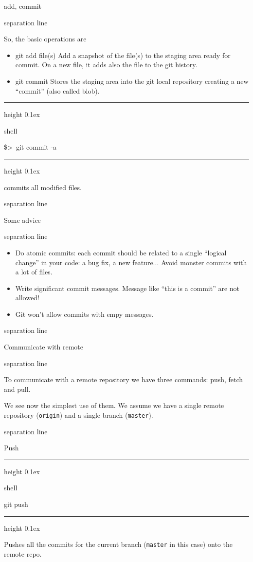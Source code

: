 \documentclass{beamer}
\newenvironment{shell}{%
\footnotesize\flushleft\hrule height 0.1ex
\tt\begin{beamercolorbox}[sep=1ex,left]{shell}%
}{%
\end{beamercolorbox}
\hrule height 0.1ex
\endflushleft\par
}
\newcommand*{\psone}[1][ant]{\$>~}
\newcommand{\titleline}[1][0.025cm]{%
\begin{beamercolorbox}[wd=\paperwidth,ht=#1,center]{separation line}%
\end{beamercolorbox}%
}
\begin{document}
\begin{frame}{add, commit}
\titleline
So, the basic operations are
\begin{itemize}
\item \alert{git add file(s)} Add a snapshot of the file(s) to the staging area ready for commit. On a new file, it adds also the file to the git history.
\item \alert{git commit} Stores the staging area into the git local repository creating a new ``commit'' (also called blob).
\end{itemize}

\begin{shell}
\psone git commit -a
\end{shell}
commits all modified files.
\titleline
\end{frame}
\begin{frame}{Some advice}
\titleline
\begin{itemize}
\item Do atomic commits: each commit should be related to a single ``logical change'' in your code: a bug fix, a new feature... Avoid monster commits with a lot of files.

\item Write significant commit messages. Message like ``this is a commit'' are not allowed!

\item Git won't allow commits with empy messages.
\end{itemize}
\titleline
\end{frame}
\begin{frame}{Communicate with remote}
\titleline

To communicate with a remote repository we have three commands:
\alert{push}, \alert{fetch} and \alert{pull}.

We see now the simplest use of them. We assume we have a single remote
repository (\texttt{origin}) and a single branch (\texttt{master}).
\titleline
\end{frame}

\begin{frame}{Push}
\begin{shell}
git push
\end{shell}
Pushes all the commits for the current branch (\texttt{master} in this case)
onto the remote repo.
\end{frame}
\end{document}

